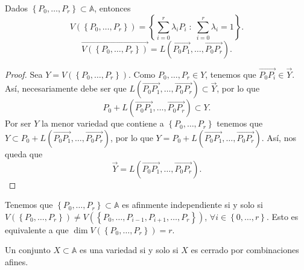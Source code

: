 \begin{lema}
	Dados $\displaystyle \left\{ P_{0}, \ldots, P_{r}\right\} \subset \mathbb{A} $, entonces 
	\[ V\left( \left\{ P_{0}, \ldots, P_{r}\right\} \right) = \left\{ \sum^{r}_{i = 0}\lambda_{i}P_{i}\; : \; \sum^{r}_{i = 0}\lambda_{i} = 1\right\}.\]
	\[  \overrightarrow{V\left( \left\{ P_{0}, \ldots, P_{r}\right\} \right)} = L\left(\overrightarrow{P_{0}P_{1}}, \ldots, \overrightarrow{P_{0}P_{r}}\right).\]
\end{lema}
\begin{proof}
	Sea $\displaystyle Y = V\left( \left\{ P_{0}, \ldots, P_{r}\right\} \right) $. Como $\displaystyle P_{0}, \ldots, P_{r} \in Y $, tenemos que $\displaystyle \overrightarrow{P_{0}P_{i}} \in \vec{Y} $. Así, necesariamente debe ser que $\displaystyle L\left(\overrightarrow{P_{0}P_{1}}, \ldots, \overrightarrow{P_{0}P_{r}}\right) \subset \vec{Y} $, por lo que
	\[P_{0} + L\left(\overrightarrow{P_{0}P_{1}}, \ldots, \overrightarrow{P_{0}P_{r}}\right) \subset Y .\]
	Por ser $\displaystyle Y $ la menor variedad que contiene a $\displaystyle \left\{ P_{0}, \ldots, P_{r}\right\}  $ tenemos que $\displaystyle Y \subset P_{0} + L\left(\overrightarrow{P_{0}P_{1}}, \ldots, \overrightarrow{P_{0}P_{r}}\right) $, por lo que $\displaystyle Y = P_{0} + L\left(\overrightarrow{P_{0}P_{1}}, \ldots, \overrightarrow{P_{0}P_{r}}\right) $. Así, nos queda que
	\[\vec{Y} = L\left(\overrightarrow{P_{0}P_{1}}, \ldots, \overrightarrow{P_{0}P_{r}}\right) .\]	
\end{proof}
\begin{observation}
	Tenemos que $\displaystyle \left\{ P_{0}, \ldots, P_{r}\right\} \subset \mathbb{A} $ es afinmente independiente si y solo si $\displaystyle V\left( \left\{ P_{0}, \ldots, P_{r}\right\} \right) \neq V\left( \left\{ P_{0}, \ldots, P_{i-1}, P_{i+1}, \ldots, P_{r}\right\} \right) $, $\displaystyle \forall i \in \left\{ 0, \ldots, r\right\}  $. Esto es equivalente a que $\displaystyle \dim V\left( \left\{ P_{0}, \ldots, P_{r}\right\} \right) =r $.	
\end{observation}
\begin{prop}
Un conjunto $\displaystyle X \subset \mathbb{A} $ es una variedad si y solo si $\displaystyle X $ es cerrado por combinaciones afines. 
\end{prop}
